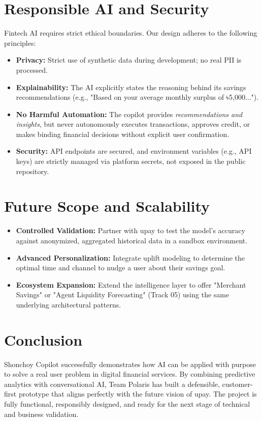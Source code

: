 \documentclass[11pt, a4paper]{article}
\begin{document}
\section{Responsible AI and Security}
Fintech AI requires strict ethical boundaries. Our design adheres to the following principles:
\begin{itemize}[leftmargin=*]
    \item \textbf{Privacy:} Strict use of synthetic data during development; no real PII is processed.
    \item \textbf{Explainability:} The AI explicitly states the reasoning behind its savings recommendations (e.g., "Based on your average monthly surplus of ৳5,000...").
    \item \textbf{No Harmful Automation:} The copilot provides \textit{recommendations and insights}, but never autonomously executes transactions, approves credit, or makes binding financial decisions without explicit user confirmation.
    \item \textbf{Security:} API endpoints are secured, and environment variables (e.g., API keys) are strictly managed via platform secrets, not exposed in the public repository.
\end{itemize}

\newpage

\section{Future Scope and Scalability}
\begin{itemize}[leftmargin=*]
    \item \textbf{Controlled Validation:} Partner with upay to test the model's accuracy against anonymized, aggregated historical data in a sandbox environment.
    \item \textbf{Advanced Personalization:} Integrate uplift modeling to determine the optimal time and channel to nudge a user about their savings goal.
    \item \textbf{Ecosystem Expansion:} Extend the intelligence layer to offer "Merchant Savings" or "Agent Liquidity Forecasting" (Track 05) using the same underlying architectural patterns.
\end{itemize}

\newpage

\section{Conclusion}
Shonchoy Copilot successfully demonstrates how AI can be applied with purpose to solve a real user problem in digital financial services. By combining predictive analytics with conversational AI, Team Polaris has built a defensible, customer-first prototype that aligns perfectly with the future vision of upay. The project is fully functional, responsibly designed, and ready for the next stage of technical and business validation.
\end{document}
